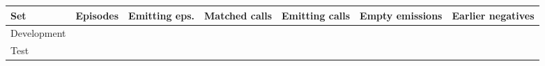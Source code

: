 \begin{tabular}{lrrrrrr}
\toprule
Set & Episodes & Emitting eps. & Matched calls & Emitting calls & Empty emissions & Earlier negatives \\
\midrule
Development & \gptossCoverageDevelopmentEpisodes{} & \gptossCoverageDevelopmentEmittingEpisodes{} & \gptossCoverageDevelopmentMatchedCalls{} & \gptossCoverageDevelopmentEmittingCalls{} & \gptossCoverageDevelopmentEmptyEmissions{} & \gptossCoverageDevelopmentRetainedEarlierNegatives{} \\
Test & \gptossCoverageFreshEpisodes{} & \gptossCoverageFreshEmittingEpisodes{} & \gptossCoverageFreshMatchedCalls{} & \gptossCoverageFreshEmittingCalls{} & \gptossCoverageFreshEmptyEmissions{} & \gptossCoverageFreshRetainedEarlierNegatives{} \\
\bottomrule
\end{tabular}
